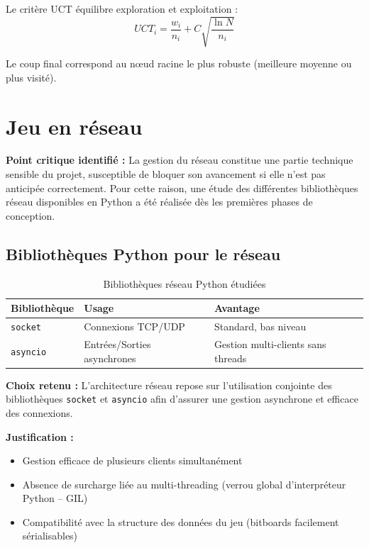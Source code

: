 \documentclass[a4paper]{article}
\begin{document}
Le critère UCT \cite{kocsis2006uct} équilibre exploration et exploitation :
\[
UCT_i = \frac{w_i}{n_i} + C \sqrt{\frac{\ln N}{n_i}}
\]

Le coup final correspond au nœud racine le plus robuste (meilleure moyenne ou plus visité).



\section{Jeu en réseau}

\textbf{Point critique identifié :}  
La gestion du réseau constitue une partie technique sensible du projet, susceptible de bloquer son avancement si elle n’est pas anticipée correctement. Pour cette raison, une étude des différentes bibliothèques réseau disponibles en Python a été réalisée dès les premières phases de conception.

\subsection{Bibliothèques Python pour le réseau}

\begin{table}[H]
\centering
\begin{tabular}{lll}
\toprule
\textbf{Bibliothèque} & \textbf{Usage} & \textbf{Avantage} \\
\midrule
\texttt{socket} & Connexions TCP/UDP & Standard, bas niveau \\
\texttt{asyncio} & Entrées/Sorties asynchrones & Gestion multi-clients sans threads \\
\bottomrule
\end{tabular}
\caption{Bibliothèques réseau Python étudiées}
\end{table}

\textbf{Choix retenu :}  
L’architecture réseau repose sur l’utilisation conjointe des bibliothèques \texttt{socket} \cite{pythonsocket} et \texttt{asyncio} afin d’assurer une gestion asynchrone et efficace des connexions.

\textbf{Justification :}
\begin{itemize}
    \item Gestion efficace de plusieurs clients simultanément
    \item Absence de surcharge liée au multi-threading (verrou global d’interpréteur Python – GIL)
    \item Compatibilité avec la structure des données du jeu (bitboards facilement sérialisables)
\end{itemize}
\end{document}
